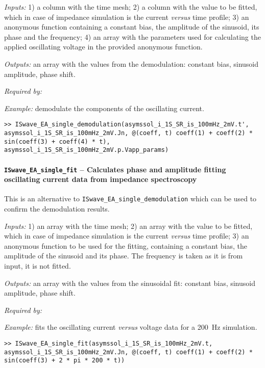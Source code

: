 	\textit{Inputs:} 1) a column with the time mesh;
	2) a column with the value to be fitted, which in case of impedance simulation is the current \textsl{versus} time profile;
	3) an anonymous function containing a constant bias, the amplitude of
	the sinusoid, its phase and the frequency;
	4) an array with the parameters used for calculating the applied
	oscillating voltage in the provided anonymous function.

	\textit{Outputs:} an array with the values from the demodulation: constant
	bias, sinusoid amplitude, phase shift.


	\textit{Required by:}


	\textit{Example:} demodulate the components of the oscillating current.
	\begin{lstlisting}[style=Matlab-editor]
>> ISwave_EA_single_demodulation(asymssol_i_1S_SR_is_100mHz_2mV.t', asymssol_i_1S_SR_is_100mHz_2mV.Jn, @(coeff, t) coeff(1) + coeff(2) * sin(coeff(3) + coeff(4) * t), asymssol_i_1S_SR_is_100mHz_2mV.p.Vapp_params)
		\end{lstlisting}


	\paragraph{\texttt{ISwave\_EA\_single\_fit} -- Calculates phase and amplitude fitting oscillating current data from impedance spectroscopy}
	This is an alternative to \texttt{ISwave\_EA\_single\_demodulation} which can be used to confirm the demodulation results.

	\textit{Inputs:} 1) an array with the time mesh;
	2) an array with the value to be fitted, which in case of impedance simulation is the current \textsl{versus} time profile;
	3) an anonymous function to be used for the fitting, containing
	a constant bias, the amplitude of the sinusoid and its phase. The
	frequency is taken as it is from input, it is not fitted.

	\textit{Outputs:} an array with the values from the sinusoidal fit: constant
	bias, sinusoid amplitude, phase shift.


	\textit{Required by:}

	\textit{Example:} fits the oscillating current \textsl{versus} voltage data for a \SI{200}{\Hz} simulation.
	\begin{lstlisting}[style=Matlab-editor]
>> ISwave_EA_single_fit(asymssol_i_1S_SR_is_100mHz_2mV.t, asymssol_i_1S_SR_is_100mHz_2mV.Jn, @(coeff, t) coeff(1) + coeff(2) * sin(coeff(3) + 2 * pi * 200 * t))
\end{lstlisting}



